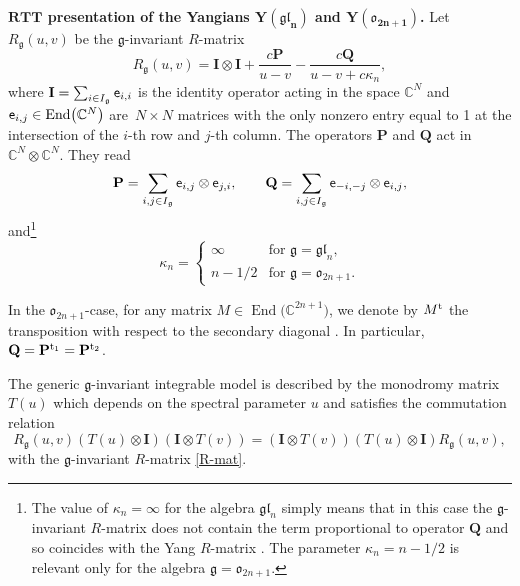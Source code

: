 \documentclass[10pt,a4paper]{amsart}
\theoremstyle{definition}
\def\CC{{\mathbb{C}}}
\def\Ee{{\sf e}}
\def\r#1{\eqref{#1}}
\def\ot{\otimes}
\def\Ig{I_{\mathfrak{g}}}
\begin{document}
{\bf $\boldsymbol{RTT}$ presentation of the Yangians $\boldsymbol{Y(\mathfrak{gl}_n)}$ and $\boldsymbol{Y(\mathfrak{o}_{2n+1})}$.}
Let $R_{\mathfrak{g}}(u,v)$ be the $\mathfrak{g}$-invariant $R$-matrix \cite{Yang,ZZ79}
\begin{equation}\label{R-mat}
 R_{\mathfrak{g}}(u,v) = \mathbf{I}\otimes\mathbf{I} + \frac{c \mathbf{P}}{u-v} - \frac{c \mathbf{Q}}{u-v+c\kappa_n} ,
\end{equation}
where $\mathbf{I}=\sum_{i\in\Ig}\Ee_{i,i}$ is the identity operator acting in the space $\CC^{N}$ and $\Ee_{i,j}\in\operatorname{ End}\bigl(\CC^N\bigr)$ are~${N\times N}$ matrices with the only nonzero entry equal to 1 at
the intersection of the $i$-th row and $j$-th column. The operators $\mathbf{P}$
and $\mathbf{Q}$ act in
$\CC^{N}\ot\CC^{N}$. They read
\begin{equation*}\label{PQ}
\mathbf{P}=\sum_{i,j\in \Ig}\Ee_{i,j}\otimes\Ee_{j,i}, \qquad
\mathbf{Q}=\sum_{i,j\in \Ig}\Ee_{-i,-j}\otimes\Ee_{i,j} ,
\end{equation*}
and\footnote{The value of $\kappa_n=\infty$ for the
algebra $\mathfrak{gl}_n$ simply means that in this case the
$\mathfrak{g}$-invariant $R$-matrix does not contain the term
proportional to operator $\mathbf{Q}$ and so coincides with the Yang $R$-matrix
\cite{Yang}. The parameter $\kappa_n=n-1/2$ is relevant only for the algebra
$\mathfrak{g}=\mathfrak{o}_{2n+1}$.\label{fn:kappa}}
\[%
\kappa_n=
\begin{cases}
\infty &\text{for } \mathfrak{g}=\mathfrak{gl}_{n} ,\\
n-1/2&\text{for } \mathfrak{g}=\mathfrak{o}_{2n+1} .
\end{cases}
\]

In the $\mathfrak{o}_{2n+1}$-case, for any matrix $M\in\operatorname{ End}\bigl(\CC^{2n+1}\bigr)$, we denote by $M^{\rm t}$ the transposition with respect to the secondary diagonal
.
In particular, $\mathbf{Q} = \mathbf{P}^{{\rm t}_{1}} = \mathbf{P}^{{\rm t}_{2}}$.

The generic $\mathfrak{g}$-invariant integrable model is described by the monodromy
matrix $T(u)$ which depends on the spectral parameter $u$ and satisfies the commutation
relation
\begin{equation}\label{RTT}
 R_{\mathfrak{g}}(u,v) \left( T(u)\otimes\mathbf{I} \right)
 \left( \mathbf{I}\otimes T(v) \right) =
 \left( \mathbf{I}\otimes T(v) \right) \left( T(u)\otimes\mathbf{I} \right)
 R_{\mathfrak{g}}(u,v) ,
\end{equation}
with the $\mathfrak{g}$-invariant $R$-matrix \r{R-mat}.
\end{document}

